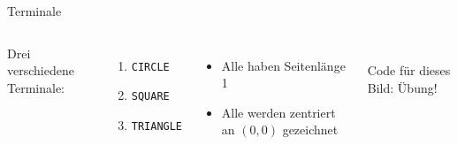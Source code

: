 \documentclass{beamer}
\theoremstyle{example}
\begin{document}
\begin{frame}{Terminale}
\begin{columns}
\column{5cm}
  Drei verschiedene Terminale:
  \begin{enumerate}
  \item \lstinline!CIRCLE!
  \item \lstinline!SQUARE!
  \item \lstinline!TRIANGLE!
  \end{enumerate}
 \begin{itemize}
 \item Alle haben Seitenlänge 1
 \item Alle werden zentriert an $(0,0)$ gezeichnet
 \end{itemize}
\column{5cm}
 \begin{center}
   \\\bigskip
   Code für dieses Bild: Übung!
 \end{center}
\end{columns}
\end{frame}
\end{document}
